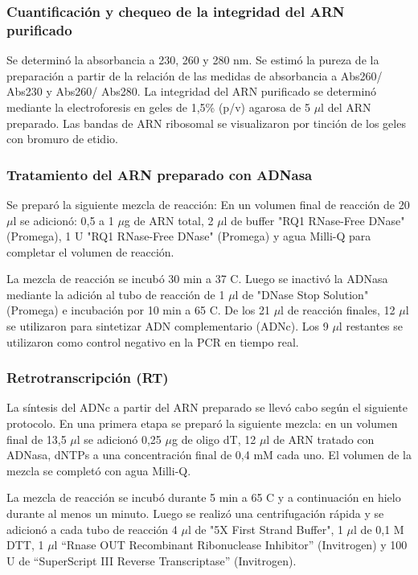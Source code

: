 \subsubsection{Cuantificación y chequeo de la integridad del ARN purificado}
Se determinó la absorbancia a 230, 260 y 280 nm. Se estimó la pureza de la preparación a partir de la relación de las medidas de absorbancia a Abs260/ Abs230 y Abs260/ Abs280.
La integridad del ARN purificado se determinó mediante la electroforesis en geles de 1,5\% (p/v) agarosa de 5 $\mu$l del ARN preparado. Las bandas de
ARN ribosomal se visualizaron por tinción de los geles con bromuro de etidio.

\subsubsection{Tratamiento del ARN preparado con ADNasa}
Se preparó la siguiente mezcla de reacción:
En un volumen final de reacción de 20 $\mu$l se adicionó: 0,5 a 1 $\mu$g de ARN total, 2 $\mu$l de buffer "RQ1 RNase-Free DNase" (Promega), 1 U "RQ1 RNase-Free DNase" (Promega) y agua Milli-Q para completar el volumen de reacción.

La mezcla de reacción se incubó 30 min a 37 \degree C. Luego se inactivó la ADNasa mediante la adición al tubo de reacción de 1 $\mu$l de "DNase Stop Solution" (Promega) e incubación por 10 min a 65 \degree  C.
De los 21 $\mu$l de reacción finales, 12 $\mu$l se utilizaron para sintetizar ADN complementario (ADNc).
Los 9 $\mu$l restantes se utilizaron como control negativo en la PCR en tiempo real.


\subsubsection{Retrotranscripción (RT)}
La síntesis del ADNc a partir del ARN preparado se llevó cabo según el siguiente protocolo.
En una primera etapa se preparó la siguiente mezcla: en un volumen final de 13,5 $\mu$l se adicionó 0,25 $\mu$g de oligo dT, 12 $\mu$l de ARN tratado con ADNasa, dNTPs a una concentración final de 0,4 mM cada uno.
El volumen de la mezcla se completó con agua Milli-Q.

La mezcla de reacción se incubó durante 5 min a 65 \degree C y a continuación en hielo durante al menos un minuto.
Luego se realizó una centrifugación rápida y se adicionó a cada tubo de reacción 4 $\mu$l de "5X First Strand Buffer", 1 $\mu$l de 0,1 M DTT, 1 $\mu$l “Rnase OUT Recombinant Ribonuclease Inhibitor” (Invitrogen) y 100 U de “SuperScript III Reverse Transcriptase” (Invitrogen).

